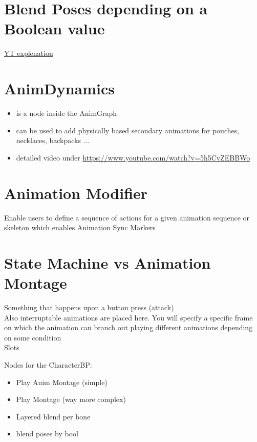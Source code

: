     \section{Blend Poses depending on a Boolean value}
        \href{https://www.youtube.com/watch?v=TiQjjcvM7Eo}{YT explenation}
    

    \section{AnimDynamics}
        \begin{itemize}
            \item is a node inside the AnimGraph
            \item can be used to add physically based secondary animations for pouches, necklaces, backpacks ...
            \item detailed video under \href{https://www.youtube.com/watch?v=5h5CvZEBBWo}{https://www.youtube.com/watch?v=5h5CvZEBBWo}
        \end{itemize}

    \section{Animation Modifier}
        Enable users to define a sequence of actions for a given animation sequence or skeleton which enables Animation Sync Markers

    \section{State Machine vs Animation Montage}
        Something that happens upon a button press (attack) \\
        Also interruptable animations are placed here. You will specify a specific frame on which the animation can
        branch out playing different animations depending on some condition \\
        Slots 

        Nodes for the CharacterBP:
        \begin{itemize}
            \item Play Anim Montage (simple)
            \item Play Montage (way more complex)
            \item Layered blend per bone
            \item blend poses by bool
        \end{itemize}
    \smallskip


